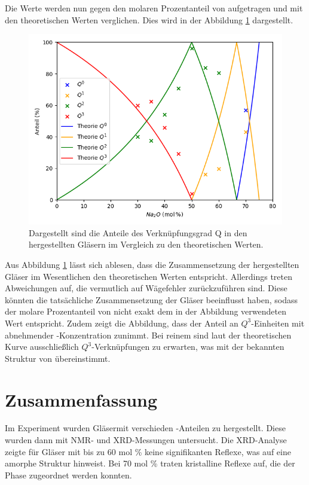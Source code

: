 \documentclass[12pt, a4paper]{article}
\begin{document}
\noindent
Die Werte werden nun gegen den molaren Prozentanteil von  aufgetragen und mit den theoretischen Werten verglichen.
Dies wird in der Abbildung \ref{plot} dargestellt.
\newpage
\begin{figure}
  \centering
  \includegraphics[scale=0.7]{plot.png}
  \caption{Dargestellt sind die Anteile des Verknüpfungsgrad Q in den hergestellten Gläsern im Vergleich zu den theoretischen Werten.\cite{Kirkpatrick.1995}}
  \label{plot}
\end{figure}

\noindent
Aus Abbildung \ref{plot} lässt sich ablesen, dass die Zusammensetzung der hergestellten Gläser im Wesentlichen den theoretischen Werten entspricht. Allerdings treten Abweichungen auf, die vermutlich auf Wägefehler zurückzuführen sind. Diese könnten die tatsächliche Zusammensetzung der Gläser beeinflusst haben, sodass der molare Prozentanteil von  nicht exakt dem in der Abbildung verwendeten Wert entspricht.
Zudem zeigt die Abbildung, dass der Anteil an $Q^3$-Einheiten mit abnehmender -Konzentration zunimmt. Bei reinem  sind laut der theoretischen Kurve ausschließlich $Q^3$-Verknüpfungen zu erwarten, was mit der bekannten Struktur von  übereinstimmt.


\newpage
\section{Zusammenfassung}
Im Experiment wurden Gläsermit verschieden -Anteilen zu  hergestellt. Diese wurden dann mit NMR- und XRD-Messungen untersucht.
Die XRD-Analyse zeigte für Gläser mit bis zu 60 mol \%  keine signifikanten Reflexe, was auf eine amorphe Struktur hinweist. Bei 70 mol \%  traten kristalline Reflexe auf, die der Phase  zugeordnet werden konnten.
\end{document}
